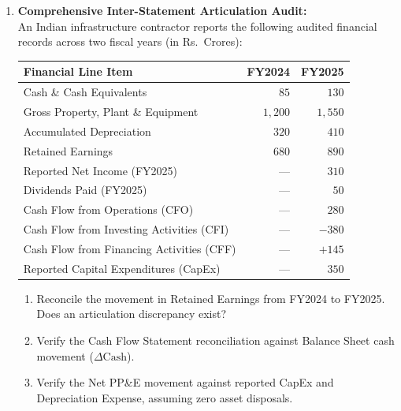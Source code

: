 \begin{enumerate}[label=\textbf{P4.\arabic*}]
    \item \textbf{Comprehensive Inter-Statement Articulation Audit:}\\
    An Indian infrastructure contractor reports the following audited financial records across two fiscal years (in Rs.~Crores):
    \begin{center}
    \begin{tabular}{lrr}
    \toprule
    \textbf{Financial Line Item} & \textbf{FY2024} & \textbf{FY2025} \\
    \midrule
    Cash \& Cash Equivalents & $85$ & $130$ \\
    Gross Property, Plant \& Equipment & $1{,}200$ & $1{,}550$ \\
    Accumulated Depreciation & $320$ & $410$ \\
    Retained Earnings & $680$ & $890$ \\
    Reported Net Income (FY2025) & --- & $310$ \\
    Dividends Paid (FY2025) & --- & $50$ \\
    Cash Flow from Operations (CFO) & --- & $280$ \\
    Cash Flow from Investing Activities (CFI) & --- & $-380$ \\
    Cash Flow from Financing Activities (CFF) & --- & $+145$ \\
    Reported Capital Expenditures (CapEx) & --- & $350$ \\
    \bottomrule
    \end{tabular}
    \end{center}
    \begin{enumerate}[label=(\alph*)]
        \item Reconcile the movement in Retained Earnings from FY2024 to FY2025. Does an articulation discrepancy exist?
        \item Verify the Cash Flow Statement reconciliation against Balance Sheet cash movement ($\Delta \text{Cash}$).
        \item Verify the Net PP\&E movement against reported CapEx and Depreciation Expense, assuming zero asset disposals.
    \end{enumerate}


\end{enumerate}
